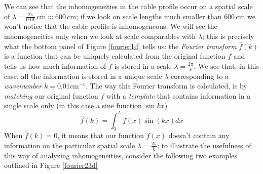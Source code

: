 \documentclass[11pt, a4paper,oneside,openright]{book}
\numberwithin{equation}{section}
\begin{document}
We can see that the inhomogeneities in the cable profile occur on a spatial scale of $\lambda=\frac{2\pi}{0.01}\,\mathrm{cm}\approx 600\,\mathrm{cm}$; if we look on scale lengths much smaller than $600$\,cm we won't notice that the cable profile is inhomogeneous. We will see the inhomogeneities only when we look at scale comparables with $\lambda$; this is precisely what the bottom panel of Figure \ref{fourier1d} tells us: the \textit{Fourier transform} $\hat{f}(k)$ is a function that can be uniquely calculated from the original function $f$ and tells us how much information of $f$ is stored in a scale $\lambda=\frac{2\pi}{k}$. We see that, in this case, all the information is stored in a unique scale $\lambda$ corresponding to a \textit{wavenumber} $k=0.01\mathrm{cm}^{-1}$. The way this Fourier transform is calculated, is by \textit{matching} our original function $f$ with a \textit{template} that contains information in a single scale only (in this case a sine function $\sin{kx}$) 
\begin{equation}
\label{trasf1d}
\hat{f}(k)=\int_0^Lf(x)\sin{(kx)}dx
\end{equation}
When $\hat{f}(k)=0$, it means that our function $f(x)$ doesn't contain any information on the particular spatial scale $\lambda=\frac{2\pi}{k}$; to illustrate the usefulness of this way of analyzing inhomogeneities, consider the following two examples outlined in Figure \ref{fourier23d}
\end{document}
